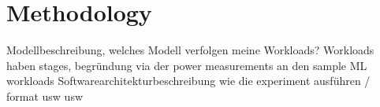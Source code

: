 \chapter{Methodology}

Modellbeschreibung, welches Modell verfolgen meine Workloads?
Workloads haben stages, begründung via der power measurements an den sample ML workloads
Softwarearchitekturbeschreibung
wie die experiment ausführen / format usw usw